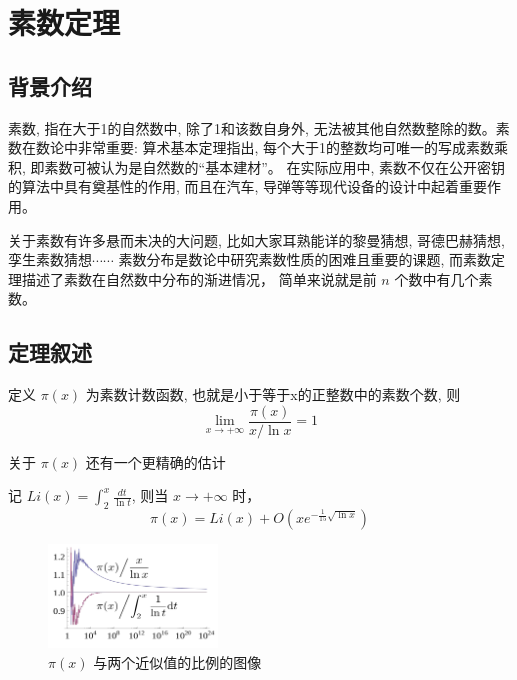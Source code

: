 \documentclass[main]{subfiles}
\begin{document}
\renewcommand{\filename}{素数定理}%
\section{素数定理}
\subsection*{背景介绍}
素数, 指在大于1的自然数中, 除了1和该数自身外, 无法被其他自然数整除的数。素数在数论中非常重要: 算术基本定理指出, 每个大于1的整数均可唯一的写成素数乘积, 即素数可被认为是自然数的“基本建材”。
在实际应用中, 素数不仅在公开密钥的算法中具有奠基性的作用, 而且在汽车, 导弹等等现代设备的设计中起着重要作用。
\par 关于素数有许多悬而未决的大问题, 比如大家耳熟能详的黎曼猜想, 哥德巴赫猜想, 孪生素数猜想$\cdots \cdots$ 素数分布是数论中研究素数性质的困难且重要的课题, 而素数定理描述了素数在自然数中分布的渐进情况， 简单来说就是前 $n$ 个数中有几个素数。
\subsection{定理叙述}
\begin{theorem}[素数定理]
    定义 $\pi(x)$ 为素数计数函数, 也就是小于等于x的正整数中的素数个数, 则
    \[ \lim_{x \rightarrow + \infty} \frac{\pi(x)}{x/ \ln x} = 1 \]
\end{theorem}
关于 $\pi(x)$ 还有一个更精确的估计 
\begin{theorem}[另一个估计]
    记 $Li(x) = \int_{2}^{x} \frac{dt}{\ln t}$, 则当 $x \rightarrow + \infty$ 时，
    \[ \pi(x) = Li(x) + O(xe^{-\frac{1}{15} \sqrt{\ln x}}) \]
    
\end{theorem}

\begin{figure}[H]
	\centering
		\includegraphics[width=0.40\textwidth]{pnt1.png}
		 \caption{$\pi(x)$ 与两个近似值的比例的图像}
\end{figure}
\end{document}
